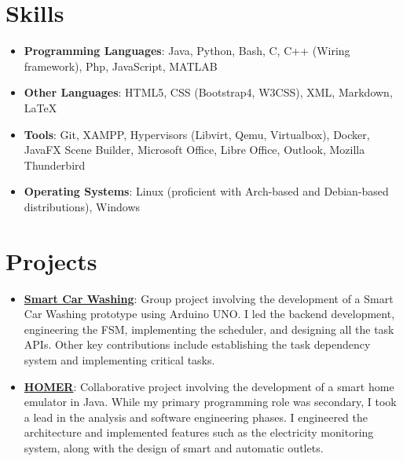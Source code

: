 \documentclass[letterpaper,11pt]{article}
\newcommand{\resumeItem}[2]{
  \item\small{
    \textbf{#1}{: #2 \vspace{-2pt}}
  }
}
\newcommand{\resumeSubItem}[2]{\resumeItem{#1}{#2}\vspace{-4pt}}
\newcommand{\resumeSubHeadingListStart}{\begin{itemize}[leftmargin=*]}
\newcommand{\resumeSubHeadingListEnd}{\end{itemize}}
\begin{document}
\section{Skills}
 \resumeSubHeadingListStart
   \item{
     \textbf{Programming Languages}{: Java, Python, Bash, C, C++ (Wiring framework), Php, JavaScript, MATLAB}
     \hfill
     }
     \item{
     \textbf{Other Languages}{: HTML5, CSS (Bootstrap4, W3CSS), XML, Markdown, LaTeX}
     \hfill
     }
     \item{
     \textbf{Tools}{: Git, XAMPP, Hypervisors (Libvirt, Qemu, Virtualbox), Docker, JavaFX Scene Builder, Microsoft Office, Libre Office, Outlook, Mozilla Thunderbird}
     \hfill
     }
     \item{
     \textbf{Operating Systems}{: Linux (proficient with Arch-based and Debian-based distributions), Windows}
     }
 \resumeSubHeadingListEnd
\section{Projects}
  \resumeSubHeadingListStart
    \resumeSubItem{\href{https://github.com/aleemont1/esiot-23-24-assignment2/}{Smart Car Washing}}
      {Group project involving the development of a Smart Car Washing prototype using Arduino UNO. 
      I led the backend development, engineering the FSM, implementing the scheduler, and designing all the task APIs. 
      Other key contributions include establishing the task dependency system and implementing critical tasks.}
    \resumeSubItem{\href{https://github.com/progetto-oop-22-23/OOP22-HOMER}{HOMER}}
      {Collaborative project involving the development of a smart home emulator in Java. 
        While my primary programming role was secondary, I took a lead in the analysis and software engineering phases. 
        I engineered the architecture and implemented features such as the electricity monitoring system, 
        along with the design of smart and automatic outlets.}
  \resumeSubHeadingListEnd
\end{document}
